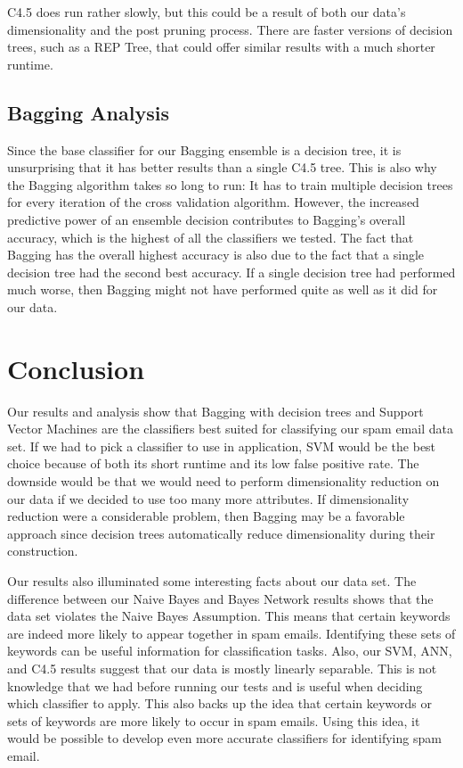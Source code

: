 \documentclass[11pt,oneside,reqno]{amsart}
\theoremstyle{definition}
\theoremstyle{definition}
\theoremstyle{remark}
\numberwithin{equation}{section}
\numberwithin{equation}{section}
\begin{document}
C4.5 does run rather slowly, but this could be a result of both our data's dimensionality and the post pruning process. There are faster versions of decision trees, such as a REP Tree, that could offer similar results with a much shorter runtime.
 
\subsection{Bagging Analysis}
Since the base classifier for our Bagging ensemble is a decision tree, it is unsurprising that it has better results than a single C4.5 tree. This is also why the Bagging algorithm takes so long to run: It has to train multiple decision trees for every iteration of the cross validation algorithm. However, the increased predictive power of an ensemble decision contributes to Bagging's overall accuracy, which is the highest of all the classifiers we tested. The fact that Bagging has the overall highest accuracy is also due to the fact that a single decision tree had the second best accuracy. If a single decision tree had performed much worse, then Bagging might not have performed quite as well as it did for our data.

\section{Conclusion}
Our results and analysis show that Bagging with decision trees and Support Vector Machines are the classifiers best suited for classifying our spam email data set. If we had to pick a classifier to use in application, SVM would be the best choice because of both its short runtime and its low false positive rate. The downside would be that we would need to perform dimensionality reduction on our data if we decided to use too many more attributes. If dimensionality reduction were a considerable problem, then Bagging may be a favorable approach since decision trees automatically reduce dimensionality during their construction. 

Our results also illuminated some interesting facts about our data set. The difference between our Naive Bayes and Bayes Network results shows that the data set violates the Naive Bayes Assumption. This means that certain keywords are indeed more likely to appear together in spam emails. Identifying these sets of keywords can be useful information for classification tasks. Also, our SVM, ANN, and C4.5 results suggest that our data is mostly linearly separable. This is not knowledge that we had before running our tests and is useful when deciding which classifier to apply. This also backs up the idea that certain keywords or sets of keywords are more likely to occur in spam emails. Using this idea, it would be possible to develop even more accurate classifiers for identifying spam email.



\end{document}
